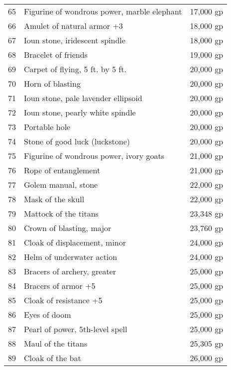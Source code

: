 \begin{table}[]
\begin{tabularx}{\linewidth}{lXl}
65  & Figurine of wondrous power, marble elephant & 17,000 gp    \\
66  & Amulet of natural armor +3                  & 18,000 gp    \\
67  & Ioun stone, iridescent spindle              & 18,000 gp    \\
68  & Bracelet of friends                         & 19,000 gp    \\
69  & Carpet of flying, 5 ft. by 5 ft.            & 20,000 gp    \\
70  & Horn of blasting                            & 20,000 gp    \\
71  & Ioun stone, pale lavender ellipsoid         & 20,000 gp    \\
72  & Ioun stone, pearly white spindle            & 20,000 gp    \\
73  & Portable hole                               & 20,000 gp    \\
74  & Stone of good luck (luckstone)              & 20,000 gp    \\
75  & Figurine of wondrous power, ivory goats     & 21,000 gp    \\
76  & Rope of entanglement                        & 21,000 gp    \\
77  & Golem manual, stone                         & 22,000 gp    \\
78  & Mask of the skull                           & 22,000 gp    \\
79  & Mattock of the titans                       & 23,348 gp    \\
80  & Crown of blasting, major                    & 23,760 gp    \\
81  & Cloak of displacement, minor                & 24,000 gp    \\
82  & Helm of underwater action                   & 24,000 gp    \\
83  & Bracers of archery, greater                 & 25,000 gp    \\
84  & Bracers of armor +5                         & 25,000 gp    \\
85  & Cloak of resistance +5                      & 25,000 gp    \\
86  & Eyes of doom                                & 25,000 gp    \\
87  & Pearl of power, 5th-level spell             & 25,000 gp    \\
88  & Maul of the titans                          & 25,305 gp    \\
89  & Cloak of the bat                            & 26,000 gp    \\

\end{tabularx}
\end{table}
